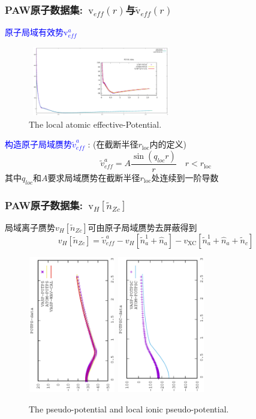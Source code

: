 \documentclass[cjk,slidestop,compress,mathserif,blue]{beamer}
\begin{document}
\frame
{
	\frametitle{\textrm{PAW}原子数据集:~$\mathrm{v}_{e\!f\!f}(r)$与$\tilde{\mathrm{v}}_{e\!f\!f}(r)$}
	\textcolor{blue}{原子局域有效势$\mathrm{v}_{e\!f\!f}^a$}
\begin{figure}[h!]
\vskip -0.17in
\centering
\includegraphics[width=2.5in,height=1.2in,viewport=0 0 1600 800, clip]{Figures/POTAE-full-dat.pdf}
\caption{\tiny \textrm{The local atomic effective-Potential.}}%
\label{local_atomic_PP}
\end{figure}
	\textcolor{blue}{构造原子局域赝势$\tilde v_{e\!f\!f}^a$}%
	:%
	(在截断半径$r_{\mathrm{loc}}$内的定义)
	$$\tilde v_{e\!f\!f}^a=A\dfrac{\sin(q_{loc}r)}r\quad r<r_{\mathrm{loc}}$$
	其中$q_{loc}$和$A$要求局域赝势在截断半径$r_{\mathrm{loc}}$处连续到一阶导数
}

\frame
{
	\frametitle{\textrm{PAW}原子数据集:~$\mathrm{v}_H[\tilde n_{Zc}]$}
	局域离子赝势$v_H[\tilde n_{Zc}]$可由原子局域赝势去屏蔽得到
	$$v_H[\tilde n_{Zc}]=\tilde v_{e\!f\!f}^a-v_H[\tilde n_a^1+\hat n_a]-v_{\mathrm{XC}}[\tilde n_a^1+\hat n_a+\tilde n_c]$$
\begin{figure}[h!]
\vskip -0.5in
\centering
\hspace*{-0.1in}
\includegraphics[width=1.5in,height=2.35in,viewport=0 0 350 550, angle=-90, clip]{Figures/POTPS-data.eps}
\hspace*{-0.7in}
\includegraphics[height=2.35in,width=1.5in,viewport=0 0 350 550, angle=-90, clip]{Figures/POTPSC-data.eps}
\caption{\tiny \textrm{The pseudo-potential and local ionic pseudo-potential.}}%
\label{pseudo_potential}
\end{figure}
}
\end{document}
